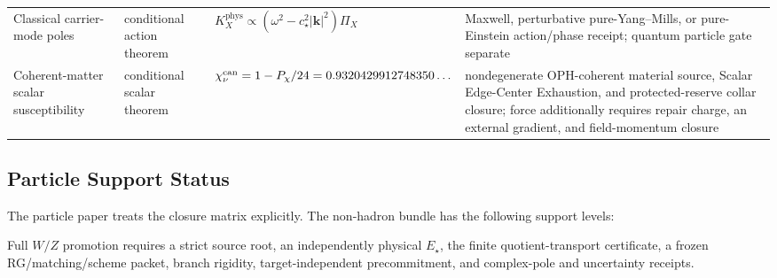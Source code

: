 \documentclass[11pt]{article}
\begin{document}
\begin{longtable}{@{}>{\raggedright\arraybackslash}p{}>{\raggedright\arraybackslash}p{}>{\raggedright\arraybackslash}p{}>{\raggedright\arraybackslash}p{}@{}}
Classical carrier-mode poles & conditional action theorem & \(K_X^{\mathrm{phys}}\propto(\omega^2-c_\star^2|\mathbf k|^2)\Pi_X\) & Maxwell, perturbative pure-Yang--Mills, or pure-Einstein action/phase receipt; quantum particle gate separate \\
Coherent-matter scalar susceptibility & conditional scalar theorem & \(\chi_\nu^{\rm can}=1-P_\chi/24=0.9320429912748350\ldots\) & nondegenerate OPH-coherent material source, Scalar Edge-Center Exhaustion, and protected-reserve collar closure; force additionally requires repair charge, an external gradient, and field-momentum closure \\
\end{longtable}
\endgroup

\subsection*{Particle Support Status}

The particle paper treats the closure matrix explicitly. The non-hadron
bundle has the following support levels:

Full \(W/Z\) promotion requires a strict source root, an independently physical
\(E_\star\), the finite quotient-transport certificate, a frozen RG/matching/scheme
packet, branch rigidity, target-independent precommitment, and complex-pole and
uncertainty receipts.
\end{document}

